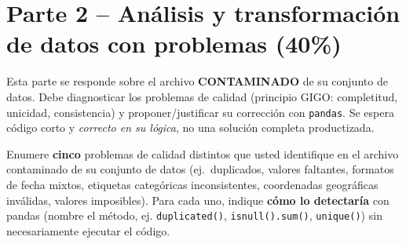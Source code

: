 \documentclass[11pt]{article}
\begin{document}
\section{Parte 2 -- Análisis y transformación de datos con problemas (40\%)}
\begin{contexto}
Esta parte se responde sobre el archivo \textbf{CONTAMINADO} de su conjunto de datos. Debe diagnosticar los problemas de calidad (principio GIGO: completitud, unicidad, consistencia) y proponer/justificar su corrección con \texttt{pandas}. Se espera código corto y \emph{correcto en su lógica}, no una solución completa productizada.
\end{contexto}

\begin{pregunta}
Enumere \textbf{cinco} problemas de calidad distintos que usted identifique en el archivo contaminado de su conjunto de datos (ej.\ duplicados, valores faltantes, formatos de fecha mixtos, etiquetas categóricas inconsistentes, coordenadas geográficas inválidas, valores imposibles). Para cada uno, indique \textbf{cómo lo detectaría} con pandas (nombre el método, ej. \texttt{duplicated()}, \texttt{isnull().sum()}, \texttt{unique()}) sin necesariamente ejecutar el código.
\end{pregunta}
\end{document}
